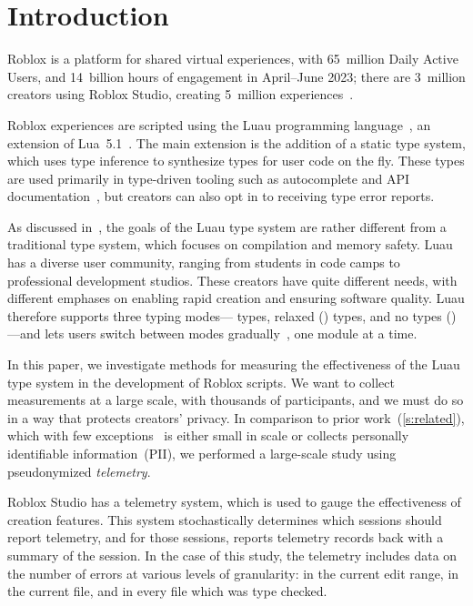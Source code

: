 \documentclass[english,submission,cleveref]{programming}
\begin{document}
\section{Introduction}
\label{s:introduction}

{Roblox} is a platform for {shared virtual experiences}, with
65~million Daily Active Users, and 14~billion hours of engagement in
April--June 2023; there are 3~million creators using {Roblox Studio},
creating 5~million experiences~\cite{corp.roblox.com}.

{Roblox experiences} are scripted using the 
{Luau} programming language~\cite{luau-lang.org},
an extension of {Lua~5.1~\cite{lua}}.
The main extension is the addition of a static type system, which uses
type inference to synthesize types for user code on the fly.
These types are used primarily in type-driven tooling such as autocomplete and
API documentation~\cite{luau-autocomplete}, but creators can also opt in to
receiving type error reports.

As discussed in~\cite{bfj-hatra-2021},
the goals of the {Luau} type system are rather different from
a traditional type system, which focuses on compilation and memory safety.
{Luau} has a diverse user community, ranging from
students in code camps to professional development studios. These
creators have quite different needs, with different emphases on
enabling rapid creation and ensuring software quality.
{Luau} therefore supports three typing modes---\mstrict{} types,
relaxed (\mnonstrict{}) types, and no types (\mnocheck{})---and lets users switch
between modes gradually~\cite{st-sfp-2006,tfffgksst-snapl-2017}, one module at a time.

In this paper, we investigate methods for measuring the effectiveness
of the {Luau} type system in the development of {Roblox} scripts.
We want to collect measurements at a large scale, with thousands
of participants, and we must do so in a way that protects creators' privacy.
In comparison to prior work~(\cref{s:related}), which
with few exceptions~\cite{zhlbr-cc-2020,zhlbr-oopsla-2020,hlzbr-ecoop-2021} is either small in scale
or collects personally identifiable information~(PII),
we performed a large-scale study using pseudonymized \emph{telemetry}.

{Roblox Studio} has a telemetry system, which is used to gauge
the effectiveness of creation features. This system stochastically
determines which sessions should report telemetry, and for those
sessions, reports telemetry records back with a summary of the
session. In the case of this study, the telemetry includes data on the
number of errors at various levels of granularity: in the current edit
range, in the current file, and in every file which was type
checked.
\end{document}
